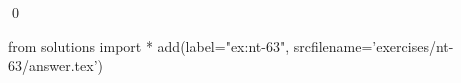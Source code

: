 
\begin{ex} 
  \label{ex:nt-63}
  
  \qed
\end{ex} 
\begin{python0}
from solutions import *
add(label="ex:nt-63",
    srcfilename='exercises/nt-63/answer.tex') 
\end{python0}
